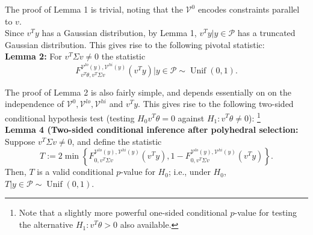 \documentclass{article}
\newcommand{\V}{\mathcal{V}}
\newcommand{\poly}{\mathcal{P}}
\newcommand{\Unif}{\operatorname{Unif}}             %
\begin{document}
The proof of Lemma 1 is trivial, noting that the $\V^0$ encodes constraints
parallel to $v$. \\

Since $v^T y$ has a Gaussian distribution, by Lemma 1, $v^T y | y \in \poly$
has a truncated Gaussian distribution. This gives rise to the following pivotal
statistic: \\

{\bf Lemma 2:} For $v^T \Sigma v \neq 0$ the statistic
\[F^{\V^{lo}(y), \V^{hi}(y)}_{v^T \theta, v^T \Sigma v}(v^T y) | y \in \poly
    \sim \Unif(0,1).\]

The proof of Lemma 2 is also fairly simple, and depends essentially on on the
independence of $\V^0,\V^{lo},\V^{hi}$ and $v^T y$. This gives rise to the
following two-sided conditional hypothesis test (testing $H_0 v^T \theta = 0$
against $H_1 : v^T \theta \neq 0$):
\footnote{Note that a slightly more powerful one-sided conditional $p$-value
for testing the alternative $H_1 : v^T \theta > 0$ also available.} \\

{\bf Lemma 4 (Two-sided conditional inference after polyhedral selection:}
Suppose $v^T \Sigma v \neq 0$, and define the statistic
\[T := 2 \min \left\{ F^{\V^{lo}(y),\V^{hi}(y)}_{0,v^T \Sigma v}(v^T y),
            1 - F^{\V^{lo}(y),\V^{hi}(y)}_{0,v^T \Sigma v}(v^T y) \right\}.\]
Then, $T$ is a valid conditional $p$-value for $H_0$; i.e., under $H_0$,
$T | y \in \poly \sim \Unif(0,1)$. \\


%
%
\end{document}
